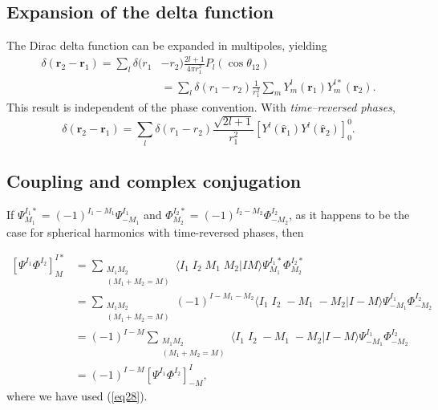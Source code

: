 \begin{subappendices}
\subsection{Expansion of the delta function}
The Dirac delta function can be expanded in multipoles, yielding
\begin{equation}\label{eq132}
\begin{split}
\delta(\mathbf{r}_2-\mathbf{r}_1)=\sum_l \delta(r_1&-r_2)\frac{2l+1}{4\pi r_{1}^2}P_l(\cos \theta_{12})\\
&=\sum_l \delta(r_1-r_2)\frac{1}{r_{1}^2}\sum_m Y_m^l(\mathbf{r}_1)Y_m^{l*}(\mathbf{r}_2).
\end{split}
\end{equation}
This result is independent of the phase convention. With \emph{time--reversed phases},
\begin{equation}\label{eq133}
\delta(\mathbf{r}_2-\mathbf{r}_1)=\sum_l \delta(r_1-r_2)\frac{\sqrt{2l+1}}{r_{1}^2}\left[ Y^{l}(\hat {\mathbf{r}}_1)Y^{l}(\hat {\mathbf{r}}_2) \right]^{0}_{0}.
\end{equation}
\subsection{Coupling and complex conjugation}
If $\Psi^{I_1*}_{M_1}=(-1)^{I_1-M_1}\Psi^{I_1}_{-M_1}$ and $\Phi^{I_2*}_{M_2}=(-1)^{I_2-M_2}\Phi^{I_2}_{-M_2}$, as it happens to be the case for spherical harmonics with time-reversed phases, then

\begin{equation}\label{eq9}
\begin{split}
\left[ \Psi^{I_1}\Phi^{I_2}\right]^{I*}_M&=\sum_{\substack{M_1M_2\\(M_1+M_2=M)}}
\langle I_1\; I_2 \; M_1\;M_2 | I M\rangle \Psi^{I_1*}_{M_1} \Phi^{I_2*}_{M_2} \\
&= \sum_{\substack{M_1M_2\\(M_1+M_2=M)}} (-1)^{I-M_1-M_2}
\langle I_1\; I_2 \; -M_1\;-M_2 | I -M\rangle \Psi^{I_1}_{-M_1}\Phi^{I_2}_{-M_2}\\
&= (-1)^{I-M} \sum_{\substack{M_1M_2\\(M_1+M_2=M)}}
\langle I_1\; I_2 \; -M_1\;-M_2 | I -M\rangle \Psi^{I_1}_{-M_1}\Phi^{I_2}_{-M_2}\\
&=(-1)^{I-M} \left[ \Psi^{I_1}\Phi^{I_2}\right]^{I}_{-M},
\end{split}
\end{equation}
where we have used (\ref{eq28}).


\end{subappendices}

